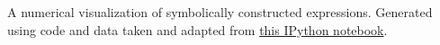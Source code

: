 \textbf{\label{fig:2}} A numerical visualization of symbolically constructed expressions. Generated using code and data taken and adapted from \href{http://nbviewer.ipython.org/static/img/example-nb/sympy.png}{this IPython notebook}.